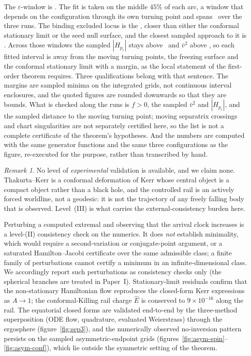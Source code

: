 \documentclass[12pt]{iopart}
\theoremstyle{plain}
\theoremstyle{definition}
\theoremstyle{remark}
\newtheorem{remark}[proposition]{Remark}
\newcommand{\Ehat}{\hat E}
\begin{document}
The $\varepsilon$-window is \provEpsWindow. The fit is taken on the middle $45\%$ of
each arc, a window that depends on the configuration through its own turning point
and spans \provFitInterval\ over the three runs. The binding excluded locus is the
\provBindingLocus, closer than either the conformal stationary limit or the seed
null surface, and the closest sampled approach to it is \provLocusSep. Across those
windows the sampled $|H_{p_r}|$ stays above \provMinHpr\ and $\bar v^2$ above
\provMinVbarSq, so
each fitted interval is away from the moving turning points, the freezing surface
and the conformal stationary limit with a margin, as the local statement of the
first-order theorem requires. Three qualifications belong with that sentence. The
margins are sampled minima on the integrated grids, not continuous interval
enclosures, and the quoted figures are rounded downwards so that they are bounds.
What is checked along the runs is $f>0$, the sampled $\bar v^2$ and $|H_{p_r}|$, and
the sampled distance to the moving turning point; moving separatrix crossings and
chart singularities are not separately certified here, so the list is not a complete
certificate of the theorem's hypotheses. And the numbers are computed with the same
generator functions and the same three configurations as the figure, re-executed for
the purpose, rather than transcribed by hand.

\begin{remark}
No level of \emph{experimental} validation is available, and we claim none.
Thakurta--Kerr is a conformal deformation of Kerr whose central object is a
compact object rather than a black hole, and the controlled rail is an actively
forced worldline, not a geodesic: it is not the trajectory of any freely falling
body that is observed. Level~(III) is what carries the external-consistency
burden here.
\end{remark}

Perturbing a computed extremal and observing that the arrival clock increases is
a level-(II) consistency check on the numerics. It does \emph{not} establish
minimality, which would require a second-variation or conjugate-point argument,
or a saturated Hamilton--Jacobi certificate over the same admissible class; a
finite family of perturbations cannot certify a minimum in an
infinite-dimensional class. We accordingly report such perturbations as
consistency checks only (the spherical branches are treated in Paper~I).
Stationary-limit residuals confirm
that the non-stationary Hamiltonian flow reproduces the closed-form Kerr expressions
as $A\to1$; the conformal-Killing rail charge $\Ehat$ is conserved to $9\times10^{-16}$ along the rail. The equatorial closed
forms are validated end-to-end by the three-method superposition
(ODE flow, quadrature, evaluated Weierstrass) through the ergosphere
(figure~\ref{fig:sep3}), and the numerically observed no-inversion pattern persists
on the sampled asymmetric-endpoint grids (figures~\ref{fig:asym-spin}--%
\ref{fig:asym-conf}), which lie outside the symmetric setting of the theorem.
\end{document}
